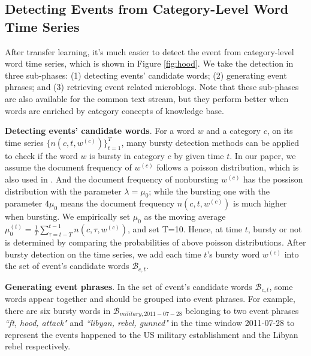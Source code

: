 \documentclass[runningheads,a4paper]{llncs}
\theoremstyle{exampstyle}
\begin{document}
\subsection{Detecting Events from Category-Level Word Time Series}
\label{subsec:detection}
After transfer learning, it's much easier to detect the event from category-level word time series, which is shown in Figure \ref{fig:hood}. We take the detection in three sub-phases: (1) detecting events' candidate words; (2) generating event phrases; and (3) retrieving event related microblogs.
Note that these sub-phases are also available for the common text stream, but they perform better when words are enriched by category concepts of knowledge base.

\textbf{Detecting events' candidate words}. For a word \(w\) and a category \(c\), on its time series \(\{n(c,t,w^{(c)})\}_{t=1}^{T}\), many bursty detection methods can be applied to check if the word \(w\) is bursty in category \(c\) by given time \(t\). 
In our paper, we assume the document frequency of \(w^{(c)}\) follows a poisson distribution, which is also used in \cite{Diao:2012wj}.
And the document frequency of nonbursting \(w^{(c)}\) has the possison distribution with the parameter \(\lambda=\mu_0\); while the bursting one with the parameter \(4\mu_0\) means the document frequency \(n(c,t,w^{(c)})\) is much higher when bursting.
We empirically set \(\mu_0\) as the moving average \(\mu_0^{(t)}=\frac{1}{T}\sum_{\tau=t-T}^{t-1}n(c,\tau,w^{(c)})\), and set T=10.
Hence, at time \(t\), bursty or not is determined by comparing the probabilities of above poisson distributions. 
After bursty detection on the time series, we add each time \(t\)'s bursty word \(w^{(c)}\) into the set of event's candidate words \(\mathcal{B}_{c,t}\).

\textbf{Generating event phrases}. 
In the set of event's candidate words \(\mathcal{B}_{c,t}\), some words appear together and should be grouped into event phrases.
For example, there are six bursty words in \(\mathcal{B}_{military,2011-07-28}\) belonging to two event phrases \textit{``ft, hood, attack"} and \textit{``libyan, rebel, gunned"} in the time window 2011-07-28 to represent the events happened to the US military establishment and the Libyan rebel respectively. 
\end{document}
